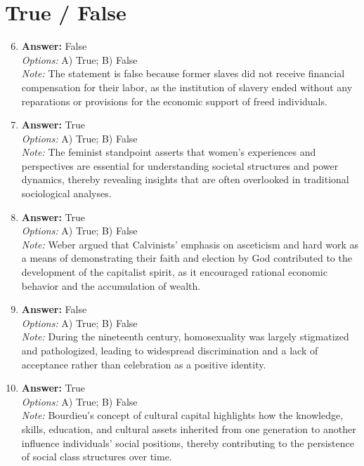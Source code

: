 \documentclass[12pt]{article}
\begin{document}
\section*{True / False}
\begin{enumerate}[label=\arabic*.]
\setcounter{enumi}{5}
\item \textbf{Answer:} False
\\ \textit{Options:} A) True; B) False
\\ \textit{Note:} The statement is false because former slaves did not receive financial compensation for their labor, as the institution of slavery ended without any reparations or provisions for the economic support of freed individuals.
\item \textbf{Answer:} True
\\ \textit{Options:} A) True; B) False
\\ \textit{Note:} The feminist standpoint asserts that women's experiences and perspectives are essential for understanding societal structures and power dynamics, thereby revealing insights that are often overlooked in traditional sociological analyses.
\item \textbf{Answer:} True
\\ \textit{Options:} A) True; B) False
\\ \textit{Note:} Weber argued that Calvinists' emphasis on asceticism and hard work as a means of demonstrating their faith and election by God contributed to the development of the capitalist spirit, as it encouraged rational economic behavior and the accumulation of wealth.
\item \textbf{Answer:} False
\\ \textit{Options:} A) True; B) False
\\ \textit{Note:} During the nineteenth century, homosexuality was largely stigmatized and pathologized, leading to widespread discrimination and a lack of acceptance rather than celebration as a positive identity.
\item \textbf{Answer:} True
\\ \textit{Options:} A) True; B) False
\\ \textit{Note:} Bourdieu's concept of cultural capital highlights how the knowledge, skills, education, and cultural assets inherited from one generation to another influence individuals' social positions, thereby contributing to the persistence of social class structures over time.
\end{enumerate}
\end{document}
